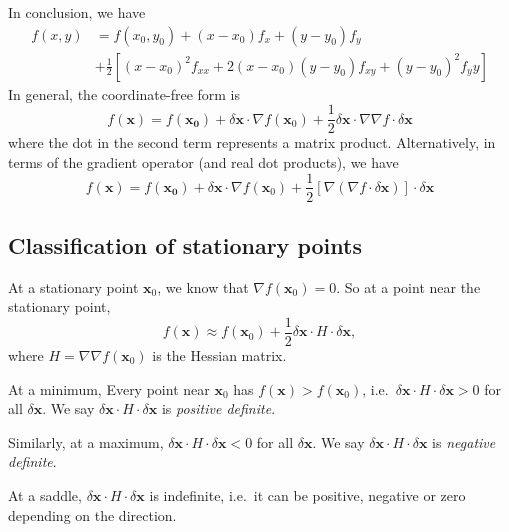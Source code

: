 \documentclass[a4paper]{article}
\begin{document}
In conclusion, we have
\begin{align*}
  f(x, y) &= f(x_0, y_0) + (x - x_0)f_x + (y - y_0)f_y \\
  &+ \frac{1}{2}[(x - x_0)^2 f_{xx} + 2(x - x_0)(y - y_0)f_{xy} + (y - y_0)^2 f_yy]
\end{align*}
In general, the coordinate-free form is
\[
  f(\mathbf{x}) = f(\mathbf{x_0}) + \delta \mathbf{x}\cdot\nabla f(\mathbf{x}_0) + \frac{1}{2}\delta \mathbf{x}\cdot \nabla \nabla f\cdot \delta \mathbf{x}
\]
where the dot in the second term represents a matrix product. Alternatively, in terms of the gradient operator (and real dot products), we have
\[
  f(\mathbf{x}) = f(\mathbf{x_0}) + \delta \mathbf{x}\cdot \nabla f(\mathbf{x}_0) + \frac{1}{2}[\nabla (\nabla f\cdot \delta \mathbf{x})]\cdot \delta\mathbf{x}
\]

\subsection{Classification of stationary points}
At a stationary point $\mathbf{x}_0$, we know that $\nabla f(\mathbf{x}_0) = 0$. So at a point near the stationary point,
\[
  f(\mathbf{x})\approx f(\mathbf{x}_0) + \frac{1}{2}\delta\mathbf{x}\cdot H\cdot \delta\mathbf{x},
\]
where $H = \nabla\nabla f(\mathbf{x}_0)$ is the Hessian matrix.

At a minimum, Every point near $\mathbf{x}_0$ has $f(\mathbf{x}) > f(\mathbf{x}_0)$, i.e.\ $\delta \mathbf{x}\cdot H\cdot \delta \mathbf{x} > 0$ for all $\delta \mathbf{x}$. We say $\delta \mathbf{x}\cdot H\cdot\delta \mathbf{x}$ is \emph{positive definite}.

Similarly, at a maximum, $\delta \mathbf{x}\cdot H\cdot \delta\mathbf{x} < 0$ for all $\delta \mathbf{x}$. We say $\delta \mathbf{x}\cdot H\cdot \delta \mathbf{x}$ is \emph{negative definite}.

At a saddle, $\delta \mathbf{x} \cdot H\cdot \delta\mathbf{x}$ is indefinite, i.e.\ it can be positive, negative or zero depending on the direction.
\end{document}
